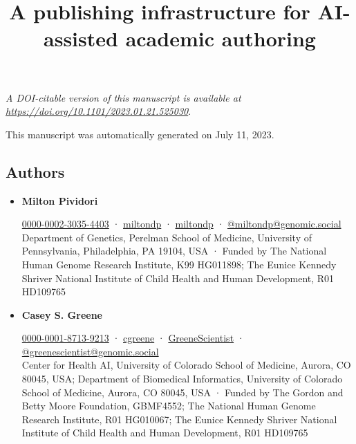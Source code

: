\documentclass[
]{article}
\title{A publishing infrastructure for AI-assisted academic authoring}
\author{}
\date{}
\begin{document}
\maketitle

\emph{A DOI-citable version of this manuscript is available at \url{https://doi.org/10.1101/2023.01.21.525030}}.

This manuscript
was automatically generated
on July 11, 2023.

\hypertarget{authors}{%
\subsection{Authors}\label{authors}}

\begin{itemize}
\item
  \textbf{Milton Pividori}
  
  \href{https://orcid.org/0000-0002-3035-4403}{0000-0002-3035-4403}
  · 
  \href{https://github.com/miltondp}{miltondp}
  · 
  \href{https://twitter.com/miltondp}{miltondp}
  · 
  \href{https://genomic.social/@miltondp}{@miltondp@genomic.social} \\
  Department of Genetics, Perelman School of Medicine, University of Pennsylvania, Philadelphia, PA 19104, USA
  · Funded by The National Human Genome Research Institute, K99 HG011898; The Eunice Kennedy Shriver National Institute of Child Health and Human Development, R01 HD109765
\item
  \textbf{Casey S. Greene}
  \textsuperscript{\protect\hyperlink{correspondence}{\Letter}}
  
  \href{https://orcid.org/0000-0001-8713-9213}{0000-0001-8713-9213}
  · 
  \href{https://github.com/cgreene}{cgreene}
  · 
  \href{https://twitter.com/GreeneScientist}{GreeneScientist}
  · 
  \href{https://genomic.social/@greenescientist}{@greenescientist@genomic.social} \\
  Center for Health AI, University of Colorado School of Medicine, Aurora, CO 80045, USA; Department of Biomedical Informatics, University of Colorado School of Medicine, Aurora, CO 80045, USA
  · Funded by The Gordon and Betty Moore Foundation, GBMF4552; The National Human Genome Research Institute, R01 HG010067; The Eunice Kennedy Shriver National Institute of Child Health and Human Development, R01 HD109765
\end{itemize}
\end{document}
